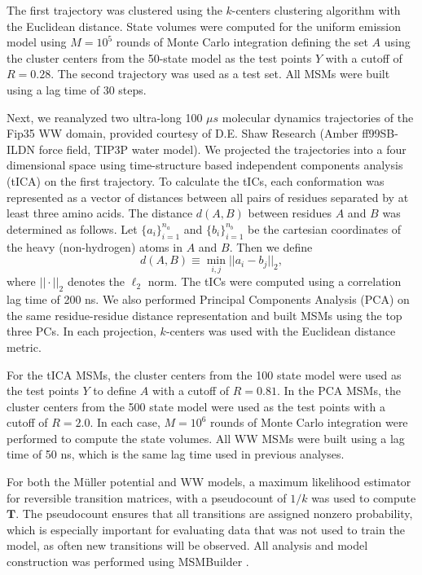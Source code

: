 \documentclass[journal=jpcbfk, layout=traditional, manuscript=article]{achemso}
\begin{document}
The first trajectory was clustered using the $k$-centers clustering algorithm with the Euclidean distance. State volumes were computed for the uniform emission model using $M=10^5$ rounds of Monte Carlo integration defining the set $A$ using the cluster centers from the 50-state model as the test points $Y$ with a cutoff of $R=0.28$. The second trajectory was used as a test set. All MSMs were built using a lag time of 30 steps.

Next, we reanalyzed two ultra-long 100 $\mu s$ molecular dynamics trajectories of the Fip35 WW domain\cite{Liu2008Experimental}, provided courtesy of D.E. Shaw Research \cite{Shaw2010Atomic} (Amber ff99SB-ILDN force field,\cite{Lindorff2010Improved} TIP3P water model\cite{Jorgensen1983Comparison}). We projected the trajectories into a four dimensional space using time-structure based independent components analysis (tICA) \cite{Schwantes2013Improvements, Perez2013Identification} on the first trajectory. To calculate the tICs, each conformation was represented as a vector of distances between all pairs of residues separated by at least three amino acids. The distance $d(A, B)$ between residues $A$ and $B$ was determined as follows. Let $\{a_i\}_{i=1}^{n_a}$ and $\{b_i\}_{i=1}^{n_b}$ be the cartesian coordinates of the heavy (non-hydrogen) atoms in $A$ and $B$. Then we define
$$
d(A,B) \equiv \min_{i, j} ||a_i - b_j||_2,
$$ where $|| \cdot ||_2$ denotes the $\ell_2$ norm. The tICs were computed using a correlation lag time of 200 ns. We also performed Principal Components Analysis (PCA) on the same residue-residue distance representation and built MSMs using the top three PCs. In each projection, $k$-centers was used with the Euclidean distance metric.

For the tICA MSMs, the cluster centers from the 100 state model were used as the test points $Y$ to define $A$ with a cutoff of $R=0.81$. In the PCA MSMs, the cluster centers from the 500 state model were used as the test points with a cutoff of $R=2.0$. In each case, $M=10^6$ rounds of Monte Carlo integration were performed to compute the state volumes. All WW MSMs were built using a lag time of 50 ns, which is the same lag time used in previous analyses\cite{Beauchamp2012Simple}.

For both the M\"{u}ller potential and WW models, a maximum likelihood estimator for reversible transition matrices, with a pseudocount of $1 / k$ was used to compute $\mathbf{T}$. The pseudocount ensures that all transitions are assigned nonzero probability, which is especially important for evaluating data that was not used to train the model, as often new transitions will be observed. All analysis and model construction was performed using MSMBuilder \cite{Beauchamp2011Msmbuilder2}.
\end{document}
